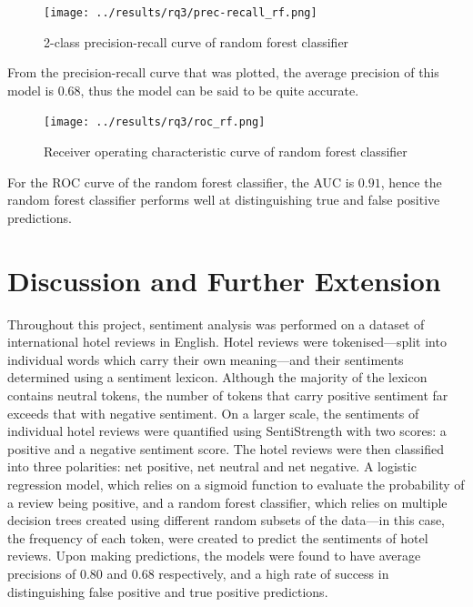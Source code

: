 \documentclass[12pt, bibliography=totocnumbered, a4paper]{scrartcl}
\begin{document}
\begin{figure}[htpb]
	\begin{center}
		\texttt{[image: ../results/rq3/prec-recall\_rf.png]}
	\end{center}
	\caption{2-class precision-recall curve of random forest classifier}
	\label{fig:rf-prcurve}
\end{figure}

From the precision-recall curve that was plotted, the average precision
of this model is \(0.68\), thus the model can be said to be quite accurate.

\begin{figure}[htpb]
	\begin{center}
		\texttt{[image: ../results/rq3/roc\_rf.png]}
	\end{center}
	\caption{Receiver operating characteristic curve of random forest classifier}
	\label{fig:rf-roc}
\end{figure}

For the ROC curve of the random forest classifier, the AUC is \(0.91\), hence
the random forest classifier performs well at distinguishing true and false
positive predictions.

\section{Discussion and Further Extension}
Throughout this project, sentiment analysis was performed on a dataset of
international hotel reviews in English. Hotel reviews were tokenised---split
into individual words which carry their own meaning---and their sentiments
determined using a sentiment lexicon. Although the majority of the lexicon
contains neutral tokens, the number of tokens that carry positive sentiment
far exceeds that with negative sentiment. On a larger scale, the sentiments
of individual hotel reviews were quantified using SentiStrength with two scores:
a positive and a negative sentiment score. The hotel reviews were then classified
into three polarities: net positive, net neutral and net negative. A logistic
regression model, which relies on a sigmoid function to evaluate the probability
of a review being positive, and a random forest classifier, which relies on multiple
decision trees created using different random subsets of the data---in this case, the
frequency of each token, were created to predict the sentiments of hotel reviews. Upon
making predictions, the models were found to have average precisions of \(0.80\) and \(0.68\)
respectively, and a high rate of success in distinguishing false positive
and true positive predictions.
\end{document}
